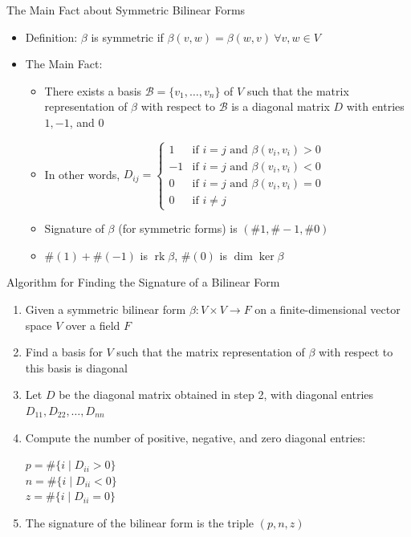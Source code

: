 \documentclass[fullscreen=true, bookmarks=true, hyperref={pdfencoding=unicode}]{beamer}
\begin{document}
\begin{frame}{The Main Fact about Symmetric Bilinear Forms}
  \begin{itemize}
    \item Definition: $\beta$ is symmetric if $\beta(v, w) = \beta(w, v) \ \forall v, w \in V$
    \item The Main Fact:
      \begin{itemize}
        \item There exists a basis $\mathcal{B} = \{v_1, \dots, v_n\}$ of $V$ 
        such that the matrix representation of $\beta$ with respect to $\mathcal{B}$ 
        is a diagonal matrix $D$ with entries $1, -1$, and $0$
        \item In other words, $D_{ij} = \left\{
          \begin{array}{cl}
            1 & \text{if } i = j \text{ and } \beta(v_i, v_i) > 0 \\
            -1 & \text{if } i = j \text{ and } \beta(v_i, v_i) < 0 \\
            0 & \text{if } i = j \text{ and } \beta(v_i, v_i) = 0 \\
            0 & \text{if } i \neq j
          \end{array}\right.$
        \pause
        \item Signature of $\beta$ (for symmetric forms) is $(\#1, \#-1, \#0)$ 
        \item $\#(1)+\#(-1)$ is $\operatorname{rk}\beta$, $\#(0)$ is $\dim \operatorname{ker} \beta$
      \end{itemize}
  \end{itemize}
\end{frame}


\begin{frame}{Algorithm for Finding the Signature of a Bilinear Form}
  \begin{enumerate}
    \item Given a symmetric bilinear form $\beta: V \times V \rightarrow F$ 
    on a finite-dimensional vector space $V$ over a field $F$
    \item Find a basis for $V$ such that the matrix representation of $\beta$ 
    with respect to this basis is diagonal
    \item Let $D$ be the diagonal matrix obtained in step 2, 
    with diagonal entries $D_{11}, D_{22}, \ldots, D_{nn}$
    \item Compute the number of positive, negative, and zero diagonal entries: \\
      \begin{center}
        $p = \#\{i \mid D_{ii} > 0\}$ \\
        $n = \#\{i \mid D_{ii} < 0\}$ \\
        $z = \#\{i \mid D_{ii} = 0\}$          
      \end{center}
    \item The signature of the bilinear form is the triple $(p, n, z)$
  \end{enumerate}
\end{frame}
\end{document}
